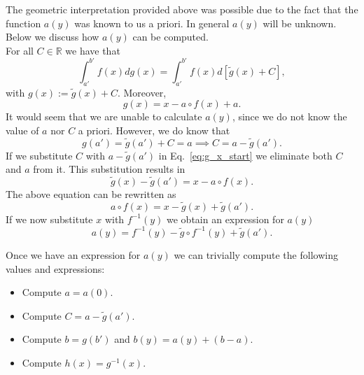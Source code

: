 \documentclass{article}
\theoremstyle{theorem}
\theoremstyle{definition}
\begin{document}
\noindent
The geometric interpretation provided above was possible due to the fact that the function $a(y)$
was known to us a priori. In general $a(y)$ will be unknown. Below we discuss how $a(y)$ can be computed.\\


\noindent
For all $C \in \mathbb{R}$ we have that
\begin{equation}
\label{eq:rs_C}
\int_{a'}^{b'} f(x)dg(x) = \int_{a'}^{b'} f(x)d[\widetilde{g}(x)+C], 
\end{equation}
with $g(x) := \widetilde{g}(x)+C$. 
Moreover, 
\begin{equation}
\label{eq:g_x_start}
g(x) =  x - a\circ f(x) + a.
\end{equation}
It would seem that we are unable to calculate $a(y)$, since we do not know the value 
of $a$ nor $C$ a priori. However, we do know that 
\begin{equation}
g(a') = \widetilde{g}(a') + C = a \implies C = a - \widetilde{g}(a'). 
\end{equation}
If we substitute $C$ with $a - \widetilde{g}(a')$ in Eq.~\eqref{eq:g_x_start} we eliminate both $C$ and $a$ from it. This 
substitution results in
\begin{equation}
\widetilde{g}(x) - \widetilde{g}(a') =  x - a\circ f(x).
\end{equation}
The above equation can be rewritten as
\begin{equation}
a\circ f(x) = x - \widetilde{g}(x) + \widetilde{g}(a').   
\end{equation}
If we now substitute $x$ with $f^{-1}(y)$ we obtain an expression for $a(y)$
\begin{equation}
a(y) = f^{-1}(y) - \widetilde{g}\circ f^{-1}(y) + \widetilde{g}(a').   
\end{equation}

\noindent
Once we have an expression for $a(y)$ we can trivially compute the following values and expressions:
\begin{itemize}
 \item Compute $a = a(0)$.
 \item Compute $C = a - \widetilde{g}(a')$.
 \item Compute $b = g(b')$ and $b(y) = a(y) + (b-a)$.
 \item Compute $h(x) = g^{-1}(x)$. 
\end{itemize}
\end{document}
